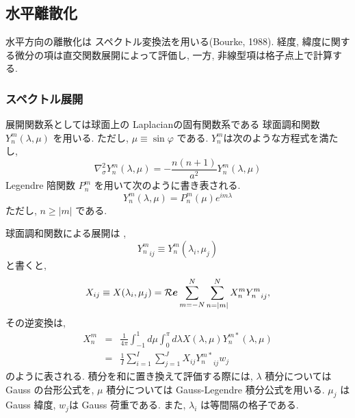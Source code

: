 ﻿\subsection{水平離散化}

水平方向の離散化は
スペクトル変換法を用いる(Bourke, 1988).
経度, 緯度に関する微分の項は直交関数展開によって評価し,
一方, 非線型項は格子点上で計算する.

\subsubsection{スペクトル展開}

展開関数系としては球面上の Laplacianの固有関数系である
球面調和関数 $Y_n^m(\lambda,\mu)$ を用いる.
ただし, $\mu \equiv \sin\varphi$ である.
$Y_n^m$は次のような方程式を満たし,
%
\begin{equation} 
\nabla^{2}_{\sigma} Y_n^m(\lambda,\mu) 
= - \frac{n(n+1)}{a^{2}} Y_n^m(\lambda,\mu) 
\end{equation}
%
Legendre 陪関数 $P_n^m$ を用いて次のように書き表される.
%
\begin{equation}
Y_n^m(\lambda,\mu) = P_n^m (\mu) e^{im \lambda}
\end{equation}
%
ただし, $ n \geq | m | $ である.

球面調和関数による展開は \footnotemark ,
\begin{equation}
   {Y_n^m}_{ij} \equiv Y_n^m ( \lambda_i, \mu_j )
\end{equation}
と書くと,
%
%
\begin{equation}
  \label{球面展開}
  X_{ij} \equiv X ( \lambda_i, \mu_j )
  =  {\cal R}\Dvect{e} \sum_{m=-N}^{N} \sum_{n=|m|}^{N} 
        X_n^m {Y_n^m}_{ij} ,
\end{equation}
%
その逆変換は,
\begin{eqnarray}
  X_n^m 
        & = & \frac{1}{4 \pi} 
             \int_{-1}^{1} d \mu \int_{0}^{\pi} d \lambda 
               X( \lambda, \mu ) Y_n^{m *} ( \lambda, \mu ) \\
        & = & \frac{1}{I} \sum_{i=1}^{I} \sum_{j=1}^{J}  
               X_{ij} {Y_n^{m*}}_{ij} w_j 
\label{展開係数}
\end{eqnarray}
%
のように表される.
%
積分を和に置き換えて評価する際には,
$\lambda$ 積分については Gauss の台形公式を,
$\mu$ 積分については Gauss-Legendre 積分公式を用いる.
$\mu_j$ は Gauss 緯度, $w_j$は Gauss 荷重である.
また, $\lambda_i$ は等間隔の格子である.

